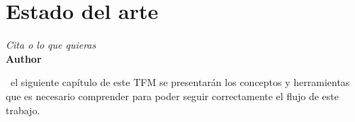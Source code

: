 \chapter{Estado del arte}

\vspace{-0.5cm}

\begin{flushright}
  \emph{\guillemotleft Cita o lo que quieras\guillemotright}\\ \textbf{Author}
\end{flushright}
\hyphenation{}
\grayMinitoc

\parindent=16mm

~el siguiente capítulo de este TFM se presentarán los conceptos y herramientas que es necesario comprender para poder seguir correctamente el flujo de este trabajo.


